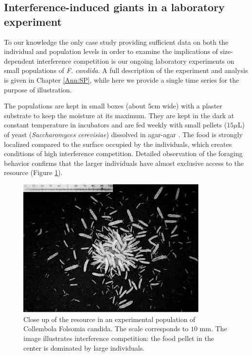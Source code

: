 \subsection{Interference-induced giants in a laboratory experiment}

To our knowledge the only case study providing sufficient data on both the
individual and population levels in order to examine the implications of
size-dependent interference competition is our ongoing laboratory experiments on
small populations of \textit{F. candida}. A full description of the experiment
and analysis is given in Chapter \ref{Ann:SP}, while here we
provide a single time series for the purpose of illustration.

The populations are kept in small boxes (about $5$cm wide) with a plaster
substrate to keep the moisture at its maximum. They are kept in the dark at
constant temperature in incubators and are fed weekly with small pellets
($15\mu$L) of yeast (\textit{Saccharomyces cerevisiae}) dissolved in agar-agar
\autocites{tully2005a,tully2008a}. The food is strongly localized compared to the
surface occupied by the individuals, which creates conditions of high
interference competition. Detailed observation of the foraging behavior confirms
that the larger individuals have almost exclusive access to the resource (Figure
\ref{Fig4-5}).

\begin{figure}[!ht] %
\centering
\includegraphics[width=0.85\textwidth]{4_ChapThe1/Fig/Fig5.pdf} 
\caption[Close up of the resource]{ Close up
of the resource in an experimental population of Collembola Folsomia candida.
The scale corresponds to $10$ mm. The image illustrates interference
competition: the food pellet in the center is dominated by large individuals. }
\label{Fig4-5}
\end{figure}


